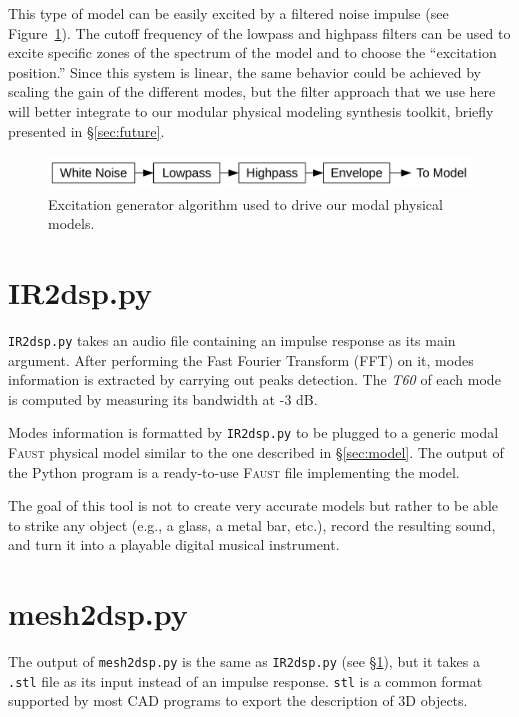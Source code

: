 \documentclass[11pt,a4paper]{article}
\newcommand{\f}{\textsc{Faust}}
\begin{document}
This type of model can be easily excited by a filtered noise impulse (see Figure~\ref{fig:excitation}). The cutoff frequency of the lowpass and highpass filters can be used to excite specific zones of the spectrum of the model and to choose the ``excitation position.'' Since this system is linear, the same behavior could be achieved by scaling the gain of the different modes, but the filter approach that we use here will better integrate to our modular physical modeling synthesis toolkit, briefly presented in \S{}\ref{sec:future}. 

\begin{figure}[htbp]
 	\centering \includegraphics[width=\columnwidth]{pictures/excitation}
	\caption{Excitation generator algorithm used to drive our modal physical models.}
	\label{fig:excitation}
\end{figure}

\section{IR2dsp.py}
\label{sec:irdsp}

\texttt{IR2dsp.py} takes an audio file containing an impulse response as its main argument. After performing the Fast Fourier Transform (FFT) on it, modes information is extracted by carrying out peaks detection. The \textit{T60} of each mode is computed by measuring its bandwidth at -3 dB.

Modes information is formatted by \texttt{IR2dsp.py} to be plugged to a generic modal \f{} physical model similar to the one described in \S{}\ref{sec:model}. The output of the Python program is a ready-to-use \f{} file implementing the model. 

The goal of this tool is not to create very accurate models but rather to be able to strike any object (e.g., a glass, a metal bar, etc.), record the resulting sound, and turn it into a playable digital musical instrument.

\section{mesh2dsp.py}

The output of \texttt{mesh2dsp.py} is the same as \texttt{IR2dsp.py} (see \S{}\ref{sec:irdsp}), but it takes a \texttt{.stl} file as its input instead of an impulse response. \texttt{stl} is a common format supported by most CAD programs to export the description of 3D objects.
\end{document}
